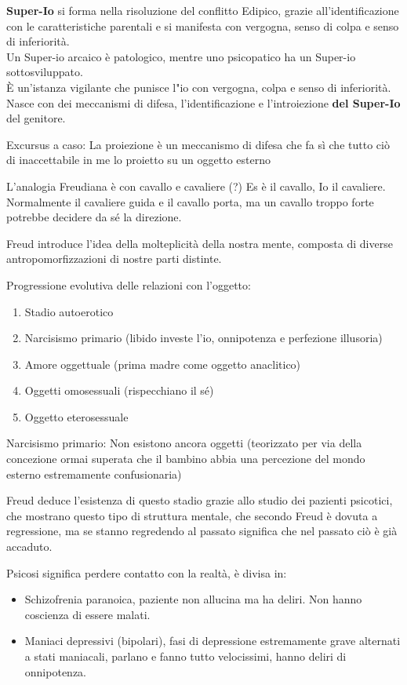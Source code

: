 \documentclass[
]{article}
\providecommand{\tightlist}{%
  \setlength{\itemsep}{0pt}\setlength{\parskip}{0pt}}
\begin{document}
\textbf{Super-Io} si forma nella risoluzione del conflitto Edipico,
grazie all'identificazione con le caratteristiche parentali e si
manifesta con vergogna, senso di colpa e senso di inferiorità.\\
Un Super-io arcaico è patologico, mentre uno psicopatico ha un Super-io
sottosviluppato.\\
È un'istanza vigilante che punisce l"io con vergogna, colpa e senso di
inferiorità. Nasce con dei meccanismi di difesa, l'identificazione e
l'introiezione \textbf{del Super-Io} del genitore.

Excursus a caso: La proiezione è un meccanismo di difesa che fa sì che
tutto ciò di inaccettabile in me lo proietto su un oggetto esterno

L'analogia Freudiana è con cavallo e cavaliere (?) Es è il cavallo, Io
il cavaliere. Normalmente il cavaliere guida e il cavallo porta, ma un
cavallo troppo forte potrebbe decidere da sé la direzione.

Freud introduce l'idea della molteplicità della nostra mente, composta
di diverse antropomorfizzazioni di nostre parti distinte.

Progressione evolutiva delle relazioni con l'oggetto:

\begin{enumerate}
\def\labelenumi{\arabic{enumi}.}
\tightlist
\item
  Stadio autoerotico
\item
  Narcisismo primario (libido investe l'io, onnipotenza e perfezione
  illusoria)
\item
  Amore oggettuale (prima madre come oggetto anaclitico)
\item
  Oggetti omosessuali (rispecchiano il sé)
\item
  Oggetto eterosessuale
\end{enumerate}

Narcisismo primario: Non esistono ancora oggetti (teorizzato per via
della concezione ormai superata che il bambino abbia una percezione del
mondo esterno estremamente confusionaria)

Freud deduce l'esistenza di questo stadio grazie allo studio dei
pazienti psicotici, che mostrano questo tipo di struttura mentale, che
secondo Freud è dovuta a regressione, ma se stanno regredendo al passato
significa che nel passato ciò è già accaduto.

Psicosi significa perdere contatto con la realtà, è divisa in:

\begin{itemize}
\tightlist
\item
  Schizofrenia paranoica, paziente non allucina ma ha deliri. Non hanno
  coscienza di essere malati.
\item
  Maniaci depressivi (bipolari), fasi di depressione estremamente grave
  alternati a stati maniacali, parlano e fanno tutto velocissimi, hanno
  deliri di onnipotenza.
\end{itemize}
\end{document}
